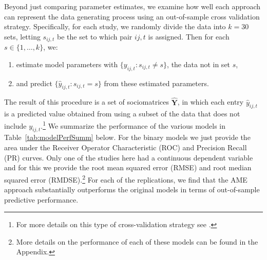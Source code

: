 Beyond just comparing parameter estimates, we examine how well each approach can represent the data generating process using an out-of-sample cross validation strategy. Specifically, for each study, we randomly divide the data into $k=30$ sets, letting $s_{ij,t}$ be the set to which pair $ij,t$ is assigned.
Then for each $s \in \{1,\ldots,k\}$, we:

\begin{enumerate}
	\item estimate model parameters with $\{y_{ij,t}: s_{ij,t} \neq s\}$, the data not in set $s$,
	\item and predict $\{\hat{y}_{ij,t}: s_{ij,t} = s\}$ from these estimated parameters. 
\end{enumerate}

\noindent The result of this procedure is a set of sociomatrices $\bm \hat Y$, in which each entry $\hat y_{ij,t}$ is a predicted value obtained from using a subset of the data that does not include $y_{ij,t}$.\footnote{For more details on this type of cross-validation strategy see \citet{minhas:etal:2016:arxiv}.} We summarize the performance of the various models in Table~\ref{tab:modelPerfSumm} below. For the binary models we just provide the area under the Receiver Operator Characteristic (ROC) and Precision Recall (PR) curves. Only one of the studies here had a continuous dependent variable and for this we provide the root mean squared error (RMSE) and root median squared error (RMDSE).\footnote{More details on the performance of each of these models can be found in the Appendix.} For each of the replications, we find that the AME approach substantially outperforms the original models in terms of out-of-sample predictive performance.


